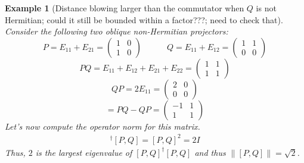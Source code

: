 \documentclass[12pt]{article}
\theoremstyle{plain}
\newtheorem{example}{Example}[section]
\begin{document}
\begin{example}[Distance blowing larger than the commutator when $Q$ is not Hermitian; could it still be bounded within a factor???; need to check that]
    Consider the following two oblique non-Hermitian projectors:
    \begin{equation}
        P = E_{11} + E_{21} = \begin{pmatrix}
            1 & 0 \\1 & 0
        \end{pmatrix}\quad\quad\quad Q = E_{11} + E_{12} = \begin{pmatrix}
            1 & 1\\0 &0
        \end{pmatrix}
    \end{equation}
    \begin{equation}
        PQ = E_{11} + E_{12} + E_{21} + E_{22} = \begin{pmatrix}
            1 & 1\\
            1 & 1
        \end{pmatrix}
    \end{equation}
    \begin{equation}
        QP = 2E_{11} = \begin{pmatrix}
            2 & 0\\0 & 0
        \end{pmatrix}
    \end{equation}
    \begin{equation}
        [P,Q] = PQ - QP = \begin{pmatrix}
            -1 & 1\\ 1 & 1
        \end{pmatrix}
    \end{equation}
Let's now compute the operator norm for this matrix.
\begin{align*}
    [P,Q]^\dagger[P,Q] = [P,Q]^2= 2I
\end{align*}
\noindent Thus, $2$ is the largest eigenvalue of $[P,Q]^\dagger[P,Q]$ and thus $\|[P,Q]\| = \sqrt{2}$.


\end{example}
\end{document}
